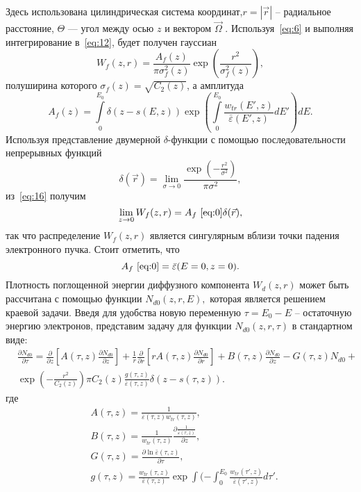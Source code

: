 Здесь использована цилиндрическая система координат,$r=|\vec{r}|$ -- радиальное
расстояние, $\Theta$ — угол между осью $z$ и вектором $\vec{\Omega}$ .
Используя~\ref{eq:6} и выполняя интегрирование в~\ref{eq:12}, будет получен гауссиан
\begin{equation}
W_f(z,r)=\frac{A_f(z)}{\pi \sigma_f^2(z)} \exp \left(\frac{r^2}{\sigma_f^2(z)}\right),
\label{eq:15}
\end{equation}
полуширина которого $\sigma_f(z)=\sqrt{C_2 (z)}$, а амплитуда
\begin{equation}
A_f(z) = \int\limits_0^{E_0}\delta( z − s(E, z))\exp\left(\int\limits_0^{E_0}\frac{w_{tr} ( E′, z)}{\bar{\varepsilon}(E′, z)}dE′\right) dE.
\end{equation}
Используя представление двумерной \(\delta\)-функции с помощью последовательности непрерывных функций \cite{korn}
\begin{equation}
\delta(\vec{r}) = \lim_{\sigma\rightarrow0} \frac{\exp\left(−\frac{r^2}{\sigma^2}\right)}{\pi\sigma^2},
\end{equation}
из~\ref{eq:16} получим
\begin{equation}
\lim_{z\rightarrow0} W_f(z, r) = A_f~\ref{eq:0}\delta(\vec{r}),
\end{equation}
так что распределение \( W_f(z, r) \) является сингулярным вблизи точки падения
электронного пучка. Стоит отметить, что
\begin{equation}
    A_f~\ref{eq:0} = \bar{\varepsilon}(E=0, z=0).    
\end{equation}
Плотность поглощенной энергии диффузного компонента \(W_d(z, r)\) может быть
рассчитана с помощью функции \(N_{d0}(z, r, E),\) которая является решением краевой задачи.
Введя для удобства новую переменную \(\tau=E_0-E\) -- остаточную энергию электронов,
представим задачу для функции \(N_{d0}(z, r, \tau)\) в стандартном виде:
\begin{align}
& \frac{\partial N_{d0}}{\partial\tau} = \frac{\partial}{\partial z}\left[A (\tau , z )\frac{\partial N_{d0}}{\partial z}\right]
+ \frac{1}{r}\frac{\partial}{\partial r}\left[rA(\tau, z)
\frac{\partial N_{d0}}{\partial r}\right] + B (\tau , z )
\frac{\partial N_{d0}}{\partial z} − G (\tau , z )N_{d0}
+ \\
& \exp\left( −\frac{r^2}{C_2(z)}\right)\pi C_2(z)\frac{g(\tau, z)}{\bar{\varepsilon} (\tau , z ) }\delta ( z − s(\tau , z )).
\nonumber
\end{align}
где
\begin{align}
& A (\tau, z) = \frac{1}{\bar{\varepsilon}(\tau, z)w_{tr} (\tau, z)}, \\
& B (\tau, z) = \frac{1}{w_{tr}(\tau, z)}\frac{\partial\frac{1}{\bar{\varepsilon}(\tau, z)}}{\partial z}, \\
& G (\tau, z) = \frac{\partial\ln\bar{\varepsilon}(\tau, z )}{\partial\tau},\\
& g(\tau, z) = \frac{w_{tr}(\tau , z )}{\bar{\varepsilon} (\tau , z )}\exp\int( −\int_0^{E_0} \frac{w_{tr}(\tau′, z )}{\bar{\varepsilon} (\tau′, z)}d\tau′.    
\end{align}

